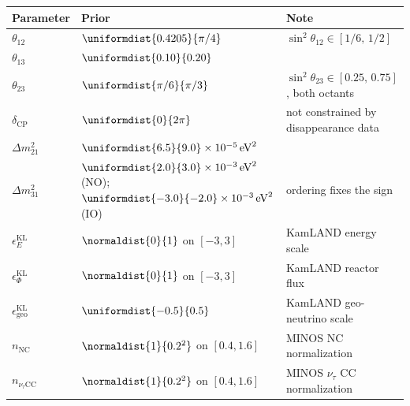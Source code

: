 \begin{tabular}{@{}lll@{}}
  \toprule
  Parameter & Prior & Note \\
  \midrule
  \(\theta_{12}\) & \(\uniformdist{0.4205}{\pi/4}\) & \(\sin^2\theta_{12}\in[1/6,\,1/2]\) \\
  \(\theta_{13}\) & \(\uniformdist{0.10}{0.20}\) &  \\
  \(\theta_{23}\) & \(\uniformdist{\pi/6}{\pi/3}\) & \(\sin^2\theta_{23}\in[0.25,\,0.75]\), both octants \\
  \(\delta_{\mathrm{CP}}\) & \(\uniformdist{0}{2\pi}\) & not constrained by disappearance data \\
  \(\Delta m^2_{21}\) & \(\uniformdist{6.5}{9.0}\times 10^{-5}\,\mathrm{eV}^2\) &  \\
  \(\Delta m^2_{31}\) & \(\uniformdist{2.0}{3.0}\times 10^{-3}\,\mathrm{eV}^2\) (NO); \(\uniformdist{-3.0}{-2.0}\times 10^{-3}\,\mathrm{eV}^2\) (IO) & ordering fixes the sign \\
  \midrule
  \(\epsilon_E^{\mathrm{KL}}\) & \(\normaldist{0}{1}\) on \([-3,3]\) & KamLAND energy scale \\
  \(\epsilon_\Phi^{\mathrm{KL}}\) & \(\normaldist{0}{1}\) on \([-3,3]\) & KamLAND reactor flux \\
  \(\epsilon_{\mathrm{geo}}^{\mathrm{KL}}\) & \(\uniformdist{-0.5}{0.5}\) & KamLAND geo-neutrino scale \\
  \(n_{\mathrm{NC}}\) & \(\normaldist{1}{0.2^2}\) on \([0.4,1.6]\) & MINOS NC normalization \\
  \(n_{\nu_\tau\mathrm{CC}}\) & \(\normaldist{1}{0.2^2}\) on \([0.4,1.6]\) & MINOS \(\nu_\tau\) CC normalization \\
  \bottomrule
\end{tabular}
